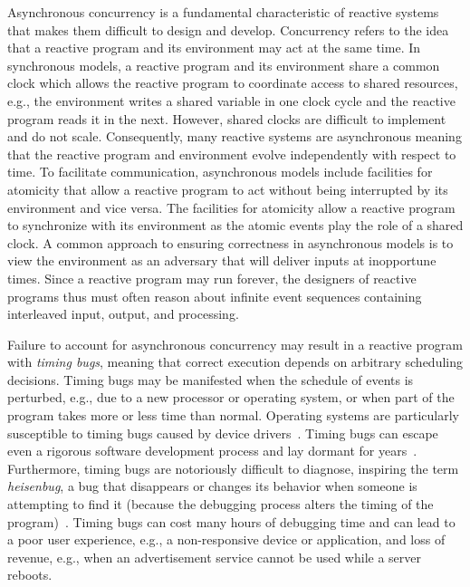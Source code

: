 Asynchronous concurrency is a fundamental characteristic of reactive systems that makes them difficult to design and develop.
Concurrency refers to the idea that a reactive program and its environment may act at the same time.
In synchronous models, a reactive program and its environment share a common clock which allows the reactive program to coordinate access to shared resources, e.g., the environment writes a shared variable in one clock cycle and the reactive program reads it in the next.
However, shared clocks are difficult to implement and do not scale.
Consequently, many reactive systems are asynchronous meaning that the reactive program and environment evolve independently with respect to time.
To facilitate communication, asynchronous models include facilities for atomicity that allow a reactive program to act without being interrupted by its environment and vice versa.
The facilities for atomicity allow a reactive program to synchronize with its environment as the atomic events play the role of a shared clock.
A common approach to ensuring correctness in asynchronous models is to view the environment as an adversary that will deliver inputs at inopportune times.
Since a reactive program may run forever, the designers of reactive programs thus must often reason about infinite event sequences containing interleaved input, output, and processing.

Failure to account for asynchronous concurrency may result in a reactive program with \emph{timing bugs}, meaning that correct execution depends on arbitrary scheduling decisions.
Timing bugs may be manifested when the schedule of events is perturbed, e.g., due to a new processor or operating system, or when part of the program takes more or less time than normal.
Operating systems are particularly susceptible to timing bugs caused by device drivers~\cite{ryzhyk2009dingo}.
Timing bugs can escape even a rigorous software development process and lay dormant for years~\cite{lee2006problem}.
Furthermore, timing bugs are notoriously difficult to diagnose, inspiring the term \emph{heisenbug}, a bug that disappears or changes its behavior when someone is attempting to find it (because the debugging process alters the timing of the program)~\cite{1983proceedings}.
Timing bugs can cost many hours of debugging time and can lead to a poor user experience, e.g., a non-responsive device or application, and loss of revenue, e.g., when an advertisement service cannot be used while a server reboots.

